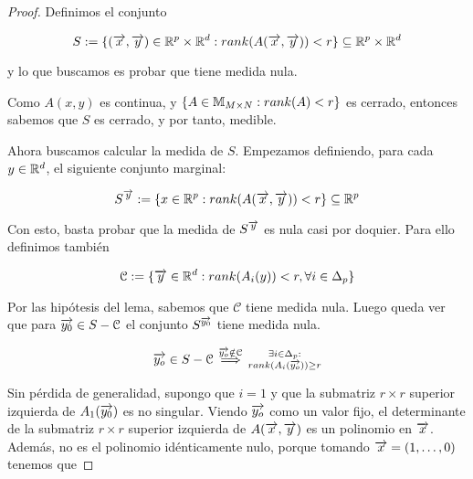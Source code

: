 \begin{proof}

    Definimos el conjunto

    \begin{equation}
        S := \{ (\overrightarrow{x}, \overrightarrow{y}) \in  \mathbb{R}^p \times \mathbb{R}^d: rank(A(\overrightarrow{x}, \overrightarrow{y})) < r \} \subseteq \mathbb{R}^p \times \mathbb{R}^d
    \end{equation}

    y lo que buscamos es probar que tiene medida nula.

    Como $A(x, y)$ es continua, y $\{ A \in \mathbb{M}_{M \times N}: rank(A) < r \}$ es cerrado, entonces sabemos que $S$ es cerrado, y por tanto, medible.

    Ahora buscamos calcular la medida de $S$. Empezamos definiendo, para cada $y \in \mathbb{R}^d$, el siguiente conjunto marginal:

    \begin{equation}
        S^{\overrightarrow{y}} := \{ x \in \mathbb{R}^p: rank(A(\overrightarrow{x}, \overrightarrow{y})) < r \} \subseteq \mathbb{R}^p
    \end{equation}

    Con esto, basta probar que la medida de $S^{\overrightarrow{y}}$ es nula casi por doquier. Para ello definimos también

    \begin{equation}
        \mathcal{C} := \{ \overrightarrow{y} \in \mathbb{R}^d: rank(A_i(y)) < r, \forall i \in \Delta_{p} \}
    \end{equation}

    Por las hipótesis del lema, sabemos que $\mathcal{C}$ tiene medida nula. Luego queda ver que para $\overrightarrow{y_0} \in S - \mathcal{C}$ el conjunto $S^{\overrightarrow{y_0}}$ tiene medida nula.

    \begin{equation}
        \begin{split}
            \overrightarrow{y_o} \in S - \mathcal{C} \stackrel{\overrightarrow{y_o} \notin \mathcal{C}}{\implies} \substack{\exists i \in \Delta_{p}: \\ rank(A_i(\overrightarrow{y_o})) \geq r}
        \end{split}
    \end{equation}

    Sin pérdida de generalidad, supongo que $i = 1$ y que la submatriz $r \times r$ superior izquierda de $A_1(\overrightarrow{y_0})$ es no singular. Viendo $\overrightarrow{y_o}$ como un valor fijo, el determinante de la submatriz $r \times r$ superior izquierda de $A(\overrightarrow{x}, \overrightarrow{y})$ es un polinomio en $\overrightarrow{x}$. Además, no es el polinomio idénticamente nulo, porque tomando $\overrightarrow{x} = (1, \ldots, 0)$ tenemos que


\end{proof}
